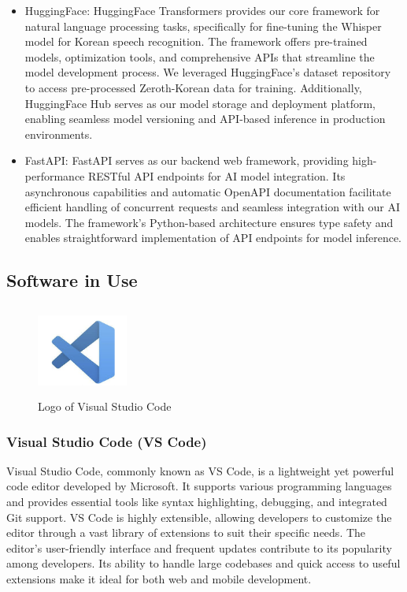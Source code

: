 \documentclass[conference]{IEEEtran}
\begin{document}
\begin{itemize}
                \item HuggingFace: HuggingFace Transformers provides our core framework for natural language processing tasks, specifically for fine-tuning the Whisper model for Korean speech recognition. The framework offers pre-trained models, optimization tools, and comprehensive APIs that streamline the model development process. We leveraged HuggingFace's dataset repository to access pre-processed Zeroth-Korean data for training. Additionally, HuggingFace Hub serves as our model storage and deployment platform, enabling seamless model versioning and API-based inference in production environments.

                \item FastAPI: FastAPI serves as our backend web framework, providing high-performance RESTful API endpoints for AI model integration. Its asynchronous capabilities and automatic OpenAPI documentation facilitate efficient handling of concurrent requests and seamless integration with our AI models. The framework's Python-based architecture ensures type safety and enables straightforward implementation of API endpoints for model inference.
            \end{itemize}

            \subsection{Software in Use}
        \begin{figure}[htbp]
            \centerline{\includegraphics[width=3cm, height=3cm]{Images/logo/vsc.png}}
            \caption{Logo of Visual Studio Code}
            \label{fig}
        \end{figure}
        \subsubsection{Visual Studio Code (VS Code)}
            Visual Studio Code, commonly known as VS Code, is a lightweight yet powerful code editor developed by Microsoft. It supports various programming languages and provides essential tools like syntax highlighting, debugging, and integrated Git support. VS Code is highly extensible, allowing developers to customize the editor through a vast library of extensions to suit their specific needs. The editor's user-friendly interface and frequent updates contribute to its popularity among developers. Its ability to handle large codebases and quick access to useful extensions make it ideal for both web and mobile development.
\end{document}
